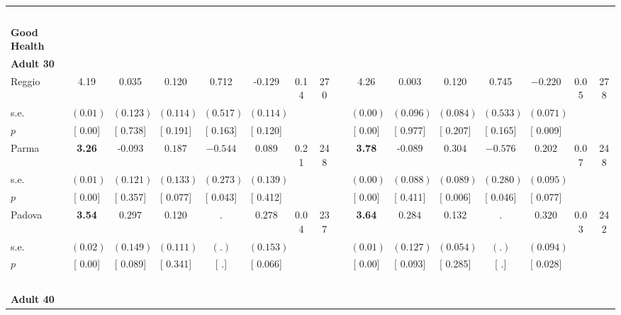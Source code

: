 \begin{longtable}{L{8em} c c c c c c c p{1em} c c c c c c c}
~\\[1em]
\textbf{Good Health} \\*
\quad \quad \textbf{Adult 30} & & & & & & & & & & & & & & & \\* 
\quad \quad \quad Reggio& 4.19 &     0.035 &     0.120 &     0.712 &    -0.129 &      0.14 &       270 & & 4.26 &     0.003 &     0.120 &     0.745 & $ \mathbf{   -0.220}$ &      0.05 &       278  \\*
\quad \quad \quad \quad s.e.& $ (     0.01)$ & $ (    0.123)$ & $ (    0.114)$ & $ (    0.517)$ & $ (    0.114)$ & & & & $ (     0.00)$ & $ (    0.096)$ & $ (    0.084)$ & $ (    0.533)$ & $ (    0.071)$ & &  \\*
\quad \quad \quad \quad $ p$ & [     0.00] & [    0.738] & [    0.191] & [    0.163] & [    0.120] & & & & [     0.00] & [    0.977] & [    0.207] & [    0.165] & [    0.009] & &  \\[1em]
\quad \quad \quad Parma& \textbf{     3.26} &    -0.093 & $ \mathbf{    0.187}$ & $ \mathbf{   -0.544}$ &     0.089 &      0.21 &       248 & & \textbf{     3.78} &    -0.089 & $ \mathbf{    0.304}$ & $ \mathbf{   -0.576}$ & $ \mathbf{    0.202}$ &      0.07 &       248  \\*
\quad \quad \quad \quad s.e.& $ (     0.01)$ & $ (    0.121)$ & $ (    0.133)$ & $ (    0.273)$ & $ (    0.139)$ & & & & $ (     0.00)$ & $ (    0.088)$ & $ (    0.089)$ & $ (    0.280)$ & $ (    0.095)$ & &  \\*
\quad \quad \quad \quad $ p$ & [     0.00] & [    0.357] & [    0.077] & [    0.043] & [    0.412] & & & & [     0.00] & [    0.411] & [    0.006] & [    0.046] & [    0.077] & &  \\[1em]
\quad \quad \quad Padova& \textbf{     3.54} & $ \mathbf{    0.297}$ &     0.120 &         . & $ \mathbf{    0.278}$ &      0.04 &       237 & & \textbf{     3.64} & $ \mathbf{    0.284}$ &     0.132 &         . & $ \mathbf{    0.320}$ &      0.03 &       242  \\*
\quad \quad \quad \quad s.e.& $ (     0.02)$ & $ (    0.149)$ & $ (    0.111)$ & $ (        .)$ & $ (    0.153)$ & & & & $ (     0.01)$ & $ (    0.127)$ & $ (    0.054)$ & $ (        .)$ & $ (    0.094)$ & &  \\*
\quad \quad \quad \quad $ p$ & [     0.00] & [    0.089] & [    0.341] & [        .] & [    0.066] & & & & [     0.00] & [    0.093] & [    0.285] & [        .] & [    0.028] & &  \\[1em]
~\\[1em]
\quad \quad \textbf{Adult 40} & & & & & & & & & & & & & & & \\* 

\end{longtable}

